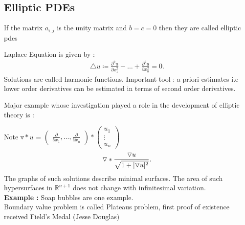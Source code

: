 \subsection*{Elliptic PDEs} %
\label{sub:Elliptic PDEs}
\begin{definition}
	If the matrix $a_{i,j}$  is the unity matrix and $b=c=0$ then they are called elliptic pdes
\end{definition}
\begin{example}
	Laplace Equation is given by :
	\begin{align*}
		\triangle u \coloneqq \frac{\partial^2 u}{\partial x_1^2} +\ldots + \frac{\partial^2 u}{\partial x_n^2} = 0
		.\end{align*}
	Solutions are called harmonic functions. Important tool : a priori estimates i.e lower order derivatives can be estimated in terms of second order derivatives.
\end{example}
Major example whose investigation played a role in the development of elliptic theory is :
\begin{example}
	Note $\triangledown * u  $ =  $\begin{pmatrix} \frac{\partial }{\partial x_1},\ldots, \frac{\partial }{\partial x_n}   \end{pmatrix} * \begin{pmatrix} u_1 \\ \vdots \\ u_n \end{pmatrix} $ \\[1ex]
	\begin{align*}
		\triangledown * \frac{\triangledown u }{\sqrt{1 + \lvert\triangledown u  \rvert^2} }
		.\end{align*}
	The graphs of such solutions describe minimal surfaces. The area of such hypersurfaces in $\mathbb{R}^{n+1} $ does not change with infinitesimal variation. \\[1ex]
	\textbf{Example : } Soap bubbles are one example. \\[1ex]
	Boundary value problem is called Plateaus problem, first proof of existence received Field's Medal (Jesse Douglas)
\end{example}
